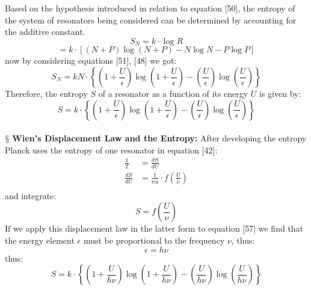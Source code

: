 \documentclass[9pt,a4paper, twocolumn]{article}
\newcommand{\newpoint}[1]{\ \\ \indent$\mathsection$ \textbf{#1}}
\begin{document}
            \\
            \\
            Based on the hypothesis introduced in relation to equation [50], the entropy of the system of resonators being considered can be determined by accounting for the additive constant.
            $$
                S_N = k\cdot\log R
            $$
            \begin{equation}
                =k\cdot\left[(N+P)\log(N+P)- N\log N - P\log P\right]
            \end{equation}
            now by considering equations [51], [48] we got:
            \begin{equation}
                S_N = kN\cdot\left\{
                    \left(1+\frac U\epsilon\right)\log\left(1+\frac U\epsilon\right) - \left(\frac U\epsilon\right)\log\left(\frac U\epsilon\right)
                \right\}
            \end{equation}
            Therefore, the entropy $S$ of a resonator as a function of its energy $U$ is given by:
            \begin{equation}
                S= k\cdot\left\{
                    \left(1+\frac U\epsilon\right)\log\left(1+\frac U\epsilon\right) - \left(\frac U\epsilon\right)\log\left(\frac U\epsilon\right)
                \right\}
            \end{equation}
            \newpoint{Wien's Displacement Law and the Entropy:} After developing the entropy Planck uses the entropy of one resonator in equation [42]: 
            \begin{align}
                \frac 1T &=\frac{dS}{dU}\\
                \frac{dS}{dU} &= \frac1{nu}\cdot f\left(\frac U\nu\right)\\
            \end{align}
            and integrate:
            \begin{equation}
                S = f\left(\frac U\nu\right)
            \end{equation}
            If we apply this displacement law in the latter form to equation [57] we find that the energy element $\epsilon$ must be proportional to the frequency $\nu$, thus:
            \begin{equation}
                \epsilon = h\nu
            \end{equation}
            thus:
            \begin{equation}
                S= k\cdot\left\{
                    \left(1+\frac U{h\nu}\right)\log\left(1+\frac U{h\nu}\right) - \left(\frac U{h\nu}\right)\log\left(\frac U{h\nu}\right)
                \right\}
            \end{equation}
\end{document}
